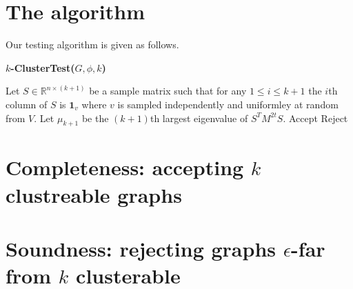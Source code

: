 \documentclass{article}
\begin{document}
\section{The algorithm}
Our testing algorithm is given as follows.
\begin{algorithm}
\caption{\textbf{$k$-ClusterTest($G,\phi,k$)}}\label{disg_alg}
\begin{algorithmic}[1]
	\State Let $S \in \mathbb{R}^{n \times (k+1)}$ be a sample matrix such that for any $1\leq i \leq k+1$ the $i$th column of $S$ is $\textbf{1}_v$ where $v$ is sampled independently and uniformley at random from $V$. 
	\State Let $\mu_{k+1}$ be the $(k+1)$th largest eigenvalue of $S^TM^{2t}S$.
		\State \Return Accept
	\Else 
		\State \Return Reject
	\EndIf
\EndProcedure
\end{algorithmic}
\end{algorithm}
\section{Completeness: accepting $k$ clustreable graphs}

\section{Soundness: rejecting graphs $\epsilon$-far from $k$ clusterable}


\medskip



\end{document}
